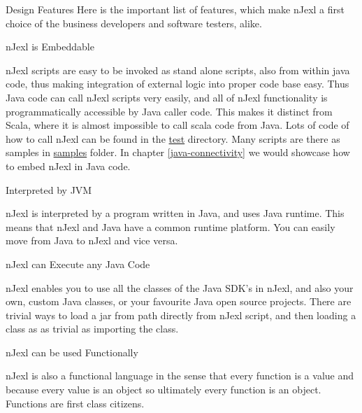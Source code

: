 \begin{section}{Design Features}
Here is the important list of features, which make nJexl a first choice of the business developers and software testers, alike.

\begin{subsection}{nJexl is Embeddable}

nJexl scripts are easy to be invoked as stand alone scripts, also from within java code, 
thus making integration of external logic into proper code base easy. Thus Java code
can call nJexl scripts very easily, and all of nJexl functionality is programmatically 
accessible by Java caller code. This makes it distinct from Scala, where it is almost impossible
to call scala code from Java. Lots of code of how to call nJexl can be found 
in the \href{https://github.com/nmondal/njexl/tree/master/lang/src/test/java/com/noga/njexl/lang}{test} directory. 
Many scripts are there as samples in \href{https://github.com/nmondal/njexl/tree/master/lang/samples}{samples} folder.
In chapter \ref{java-connectivity} we would showcase how to embed nJexl in Java code.
\end{subsection}

\begin{subsection}{Interpreted by JVM}

nJexl is interpreted by a program written in Java, and uses Java runtime. 
This means that nJexl and Java have a common runtime platform. 
You can easily move from Java to nJexl and vice versa.

\end{subsection}

\begin{subsection}{nJexl can Execute any Java Code}

nJexl enables you to use all the classes of the Java SDK's in nJexl, and also your own, custom Java classes, or your favourite Java open source projects. There are trivial ways to load a jar from path directly from nJexl script, and then loading a class as as trivial 
as importing the class.

\end{subsection}


\begin{subsection}{nJexl can be used Functionally}

nJexl is also a functional language in the sense that every function is a value and because every value is an object so ultimately every function is an object. Functions are first class citizens.


\end{subsection}
\end{section}
